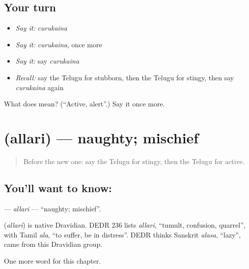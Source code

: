 \subsection*{Your turn}
\begin{itemize}
\raggedright
  \item \emph{Say it:} \emph{curukaina}
  \item \emph{Say it:} \emph{curukaina}, once more
  \item \emph{Say it:} say \emph{curukaina}
  \item \emph{Recall:} say the Telugu for stubborn, then the Telugu for stingy, then say \emph{curukaina} again
\end{itemize}

\begin{tcolorbox}[breakable,colback=teal!4,colframe=teal!35!black,title={Before you move on}]
What does  mean? (\textquotedblleft{}Active, alert\textquotedblright{}.) Say it once more.
\end{tcolorbox}
\section[\texorpdfstring{\te{అల్లరి} (allari)}{అల్లరి (allari)}]{ (allari) — naughty; mischief}

\label{lesson:TE-C297-allari}



\begin{quote}
Before the new one: say the Telugu for stingy, then the Telugu for active.
\end{quote}

\subsection*{You'll want to know: }
\textbf{} — \emph{allari} — \textquotedblleft{}naughty; mischief\textquotedblright{}.

\begin{cousinweb}
\textbf{} (\emph{allari}) is native Dravidian. DEDR 236 lists \emph{allari}, \textquotedblleft{}tumult, confusion, quarrel\textquotedblright{}, with Tamil \emph{ala}, \textquotedblleft{}to suffer, be in distress\textquotedblright{}. DEDR thinks Sanskrit \emph{alasa}, \textquotedblleft{}lazy\textquotedblright{}, came from this Dravidian group.
\end{cousinweb}

\begin{grammarlens}[title={What you've built}]
One more word for this chapter.
\end{grammarlens}

